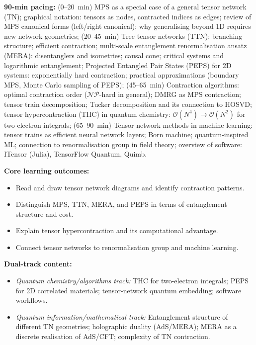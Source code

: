 \documentclass[11pt,a4paper]{article}
\begin{document}
\begin{tcolorbox}[modulebox, title={Module~II.1 --- Lecture L08: Tensor Networks}]
\textbf{90-min pacing:} (0--20~min) MPS as a special case of a general tensor network (TN);
graphical notation: tensors as nodes, contracted indices as edges;
review of MPS canonical forms (left/right canonical);
why generalising beyond 1D requires new network geometries;
(20--45~min) Tree tensor networks (TTN): branching structure; efficient contraction;
multi-scale entanglement renormalisation ansatz (MERA): disentanglers and isometries;
causal cone; critical systems and logarithmic entanglement;
Projected Entangled Pair States (PEPS) for 2D systems: exponentially hard contraction;
practical approximations (boundary MPS, Monte Carlo sampling of PEPS);
(45--65~min) Contraction algorithms: optimal contraction order ($\mathcal{NP}$-hard in
general); DMRG as MPS contraction; tensor train decomposition;
Tucker decomposition and its connection to HOSVD;
tensor hypercontraction (THC) in quantum chemistry: $\mathcal{O}(N^4)\to\mathcal{O}(N^2)$
for two-electron integrals;
(65--90~min) Tensor network methods in machine learning: tensor trains as efficient
neural network layers; Born machine; quantum-inspired ML;
connection to renormalisation group in field theory;
overview of software: ITensor (Julia), TensorFlow Quantum, Quimb.

\medskip\textbf{Core learning outcomes:}
\begin{itemize}[leftmargin=1.4em,topsep=2pt,itemsep=1pt]
  \item Read and draw tensor network diagrams and identify contraction patterns.
  \item Distinguish MPS, TTN, MERA, and PEPS in terms of entanglement structure and cost.
  \item Explain tensor hypercontraction and its computational advantage.
  \item Connect tensor networks to renormalisation group and machine learning.
\end{itemize}

\medskip\textbf{Dual-track content:}
\begin{itemize}[leftmargin=1.4em,topsep=2pt,itemsep=1pt]
  \item \textit{Quantum chemistry/algorithms track:} THC for two-electron integrals;
    PEPS for 2D correlated materials; tensor-network quantum embedding; software workflows.
  \item \textit{Quantum information/mathematical track:} Entanglement structure of different TN
    geometries; holographic duality (AdS/MERA); MERA as a discrete realisation of AdS/CFT;
    complexity of TN contraction.
\end{itemize}


\end{tcolorbox}
\end{document}
